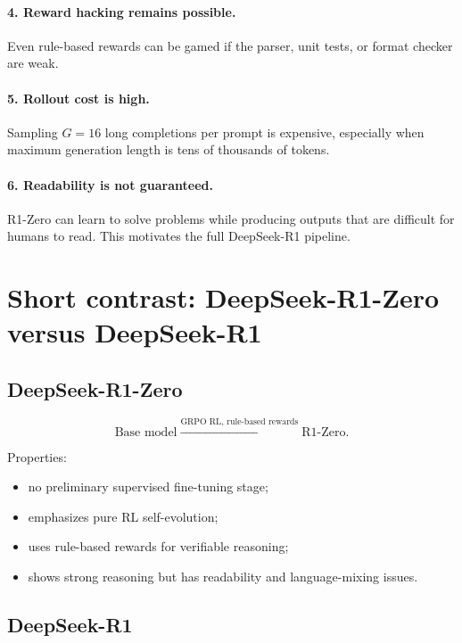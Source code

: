 \documentclass[11pt]{article}
\begin{document}
\paragraph{4. Reward hacking remains possible.}
Even rule-based rewards can be gamed if the parser, unit tests, or format checker are weak.

\paragraph{5. Rollout cost is high.}
Sampling $G=16$ long completions per prompt is expensive, especially when maximum generation length is tens of thousands of tokens.

\paragraph{6. Readability is not guaranteed.}
R1-Zero can learn to solve problems while producing outputs that are difficult for humans to read. This motivates the full DeepSeek-R1 pipeline.

\section{Short contrast: DeepSeek-R1-Zero versus DeepSeek-R1}

\subsection{DeepSeek-R1-Zero}

\begin{equation}
\boxed{\text{Base model}}
\xrightarrow{\text{GRPO RL, rule-based rewards}}
\boxed{\text{R1-Zero}}.
\end{equation}

Properties:
\begin{itemize}[leftmargin=*]
  \item no preliminary supervised fine-tuning stage;
  \item emphasizes pure RL self-evolution;
  \item uses rule-based rewards for verifiable reasoning;
  \item shows strong reasoning but has readability and language-mixing issues.
\end{itemize}

\subsection{DeepSeek-R1}
\end{document}

